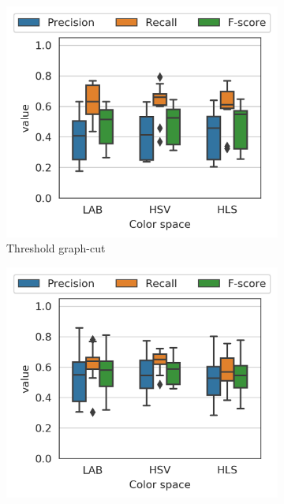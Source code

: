 \documentclass[journal]{IEEEtran}
\begin{document}
\begin{figure}[!ht]
    \centering
    \begin{subfigure}[b]{0.3\textwidth}
        \includegraphics[width=\textwidth]{Thr_graphcut_scores_log_mst_boxplot}
        \caption{Threshold graph-cut}
    \end{subfigure}\hfill     
    \begin{subfigure}[b]{0.3\textwidth}
    	\centering
    	\includegraphics[width=\textwidth]{Spectral_clustering_scores_global_complete_boxplot}

\end{subfigure}
\end{figure}
\end{document}
